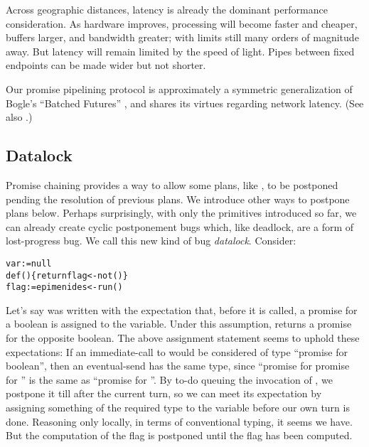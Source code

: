 \documentclass{llncs}
\begin{document}
Across geographic distances, latency is already the dominant
performance consideration. As hardware improves, processing will
become faster and cheaper, buffers larger, and bandwidth greater; with
limits still many orders of magnitude away. But latency will remain
limited by the speed of light. Pipes between fixed endpoints can be
made wider but not shorter.

Our promise pipelining protocol is approximately a symmetric
generalization of Bogle's ``Batched Futures'' \cite{bogle:batched},
and shares its virtues regarding network latency. (See also
\cite{liskov:promises}.)

\subsection{Datalock}

Promise chaining provides a way to allow some plans, like
, to be postponed pending the resolution of previous
plans. We introduce other ways to postpone plans below. Perhaps
surprisingly, with only the primitives introduced so far, we can
already create cyclic postponement bugs which, like deadlock, are a
form of lost-progress bug. 
%
%
We call this new kind of bug \emph{datalock}. Consider:
%
\begin{alltt}
    var  := null
    def () \{ return flag <- not() \}
    flag := epimenides <- run()
\end{alltt}
%
Let's say  was written with the expectation that,
before it is called, a promise for a boolean is assigned to the
 variable. Under this assumption,  returns a
promise for the opposite boolean. The above assignment statement seems
to uphold these expectations: If an immediate-call to 
would be considered of type ``promise for boolean'', then an
eventual-send has the same type, since ``promise for promise for
'' is the same as ``promise for ''. By to-do queuing
the invocation of , we postpone it till after the
current turn, so we can meet its expectation by assigning something of
the required type to the  variable before our own turn is
done. Reasoning only locally, in terms of conventional typing, it
seems we have. But the computation of the flag is postponed until the
flag has been computed.
\end{document}
